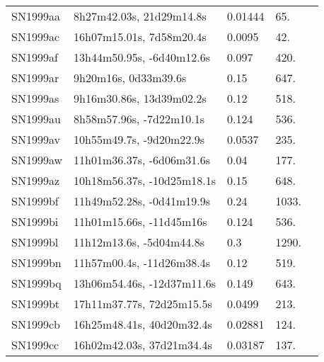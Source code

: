 \begin{longtable}{lllll}
         SN1999aa &       8h27m42.03s, 21d29m14.8s &  0.01444 &            65. &    \citet{1991RC3.9.C...0000d} \\
         SN1999ac &       16h07m15.01s, 7d58m20.4s &   0.0095 &            42. &    \citet{2008ApJ...676..184T} \\
         SN1999af &      13h44m50.95s, -6d40m12.6s &    0.097 &           420. &    \citet{1999IAUC.7117A...1K} \\
         SN1999ar &           9h20m16s, 0d33m39.6s &     0.15 &           647. &    \citet{1999IAUC.7125A...1S} \\
         SN1999as &       9h16m30.86s, 13d39m02.2s &     0.12 &           518. &    \citet{1999IAUC.7128A...1K} \\
         SN1999au &       8h58m57.96s, -7d22m10.1s &    0.124 &           536. &    \citet{1999IAUC.7130A...1G} \\
         SN1999av &       10h55m49.7s, -9d20m22.9s &   0.0537 &           235. &    \citet{20096dF...C...0000J} \\
         SN1999aw &      11h01m36.37s, -6d06m31.6s &     0.04 &           177. &    \citet{1999IAUC.7130A...1G} \\
         SN1999az &     10h18m56.37s, -10d25m18.1s &     0.15 &           648. &    \citet{1999IAUC.7131A...1S} \\
         SN1999bf &      11h49m52.28s, -0d41m19.9s &     0.24 &          1033. &    \citet{1999IAUC.7134A...1N} \\
         SN1999bi &       11h01m15.66s, -11d45m16s &    0.124 &           536. &    \citet{1999IAUC.7136A...1K} \\
         SN1999bl &       11h12m13.6s, -5d04m44.8s &      0.3 &          1290. &    \citet{1999IAUC.7136A...1K} \\
         SN1999bn &      11h57m00.4s, -11d26m38.4s &     0.12 &           519. &    \citet{1999IAUC.7136A...1K} \\
         SN1999bq &     13h06m54.46s, -12d37m11.6s &    0.149 &           643. &    \citet{1999IAUC.7136A...1K} \\
         SN1999bt &      17h11m37.77s, 72d25m15.5s &   0.0499 &           213. &    \citet{1999IAUC.7142A...1H} \\
         SN1999cb &      16h25m48.41s, 40d20m32.4s &  0.02881 &           124. &    \citet{1999PASP..111..438F} \\
         SN1999cc &      16h02m42.03s, 37d21m34.4s &  0.03187 &           137. &    \citet{2016SDSSD.C...0000:} \\

\end{longtable}
